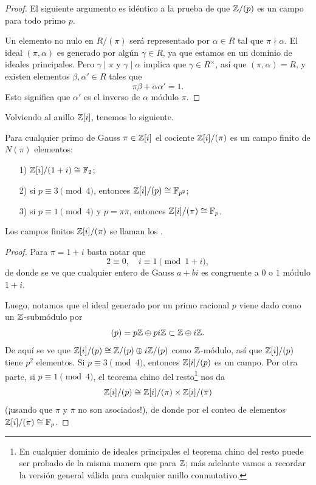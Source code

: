 \begin{proof}
  El siguiente argumento es idéntico a la prueba de que $\mathbb{Z}/(p)$ es un campo
  para todo primo $p$.

  Un elemento no nulo en $R/(\pi)$ será representado por $\alpha \in R$ tal
  que $\pi \nmid \alpha$. El ideal $(\pi,\alpha)$ es generado por algún
  $\gamma \in R$, ya que estamos en un dominio de ideales principales. Pero
  $\gamma\mid\pi$ y $\gamma\mid\alpha$ implica que $\gamma\in R^\times$, así
  que $(\pi,\alpha) = R$, y existen elementos $\beta,\alpha' \in R$
  tales que
  $$\pi\beta + \alpha\alpha' = 1.$$
  Esto significa que $\alpha'$ es el inverso de $\alpha$ módulo $\pi$.
\end{proof}

Volviendo al anillo $\mathbb{Z} [i]$, tenemos lo siguiente.

\begin{proposicion}
  Para cualquier primo de Gauss $\pi \in \mathbb{Z} [i]$ el cociente $\mathbb{Z} [i]/(\pi)$
  es un campo finito de $N (\pi)$ elementos:
  \begin{enumerate}
  \item[1)] $\mathbb{Z} [i]/(1+i) \cong \mathbb{F}_2$;
  \item[2)] si $p \equiv 3 \pmod{4}$, entonces $\mathbb{Z} [i]/(p) \cong \mathbb{F}_{p^2}$;
  \item[3)] si $p \equiv 1 \pmod{4}$ y $p = \pi \overline{\pi}$, entonces
    $\mathbb{Z} [i]/(\pi) \cong \mathbb{F}_p$.
  \end{enumerate}
\end{proposicion}

Los campos finitos $\mathbb{Z} [i]/(\pi)$ se llaman los .

\begin{proof}
  Para $\pi = 1+i$ basta notar que
  $$2 \equiv 0, \quad i \equiv 1 \pmod{1+i},$$
  de donde se ve que cualquier entero de Gauss $a+bi$ es congruente a $0$ o
  $1$ módulo $1+i$.

  Luego, notamos que el ideal generado por un primo racional $p$ viene dado
  como un $\mathbb{Z}$-submódulo por
  $$(p) = p\mathbb{Z} \oplus pi\mathbb{Z} \subset \mathbb{Z} \oplus i\mathbb{Z}.$$
  De aquí se ve que $\mathbb{Z}[i]/(p) \cong \mathbb{Z}/(p) \oplus i\mathbb{Z}/(p)$ como
  $\mathbb{Z}$-módulo, así que $\mathbb{Z}[i]/(p)$ tiene $p^2$ elementos.
  Si $p \equiv 3 \pmod{4}$, entonces $\mathbb{Z}[i]/(p)$ es un campo. Por otra parte,
  si $p \equiv 1 \pmod{4}$, el teorema chino del resto\footnote{En cualquier
    dominio de ideales principales el teorema chino del resto puede ser
    probado de la misma manera que para $\mathbb{Z}$; más adelante vamos a recordar
    la versión general válida para cualquier anillo conmutativo.} nos da
  $$\mathbb{Z}[i]/(p) \cong \mathbb{Z}[i]/(\pi) \times \mathbb{Z}[i]/(\overline{\pi})$$
  (¡usando que $\pi$ y $\overline{\pi}$ no son asociados!), de donde por el
  conteo de elementos $\mathbb{Z}[i]/(\pi) \cong \mathbb{F}_p$.
\end{proof}

